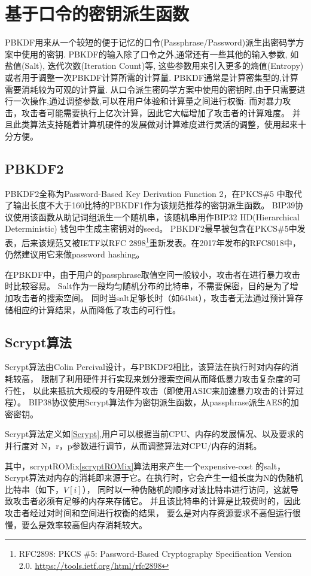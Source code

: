 
\section{基于口令的密钥派生函数}

PBKDF用来从一个较短的便于记忆的口令(Passphrase/Password)派生出密码学方案中使用的密钥.
PBKDF的输入除了口令之外,通常还有一些其他的输入参数, 如盐值(Salt), 迭代次数(Iteration Count)等,
这些参数用来引入更多的熵值(Entropy)或者用于调整一次PBKDF计算所需的计算量.
PBKDF通常是计算密集型的,计算需要消耗较为可观的计算量.
从口令派生密码学方案中使用的密钥时,由于只需要进行一次操作,通过调整参数,可以在用户体验和计算量之间进行权衡.
而对暴力攻击，攻击者可能需要执行上亿次计算，因此它大幅增加了攻击者的计算难度。
并且此类算法支持随着计算机硬件的发展做对计算难度进行灵活的调整，使用起来十分方便。

\subsection{PBKDF2}
PBKDF2全称为Password-Based Key Derivation Function 2，在PKCS\#5
中取代了输出长度不大于160比特的PBKDF1作为该规范推荐的密钥派生函数。
BIP39协议使用该函数从助记词组派生一个随机串，该随机串用作BIP32 HD(Hierarchical Deterministic)
钱包中生成主密钥对的seed。  PBKDF2最早被包含在PKCS\#5中发表，后来该规范又被IETF以RFC 
2898\footnote{
RFC2898: PKCS \#5: Password-Based Cryptography Specification Version 2.0.
\url{https://tools.ietf.org/html/rfc2898}}重新发表。在2017年发布的RFC8018中，仍然建议用它来做password hashing。

在PBKDF中，由于用户的passphrase取值空间一般较小，攻击者在进行暴力攻击时比较容易。
Salt作为一段均匀随机分布的比特串，不需要保密，目的是为了增加攻击者的搜索空间。
同时当salt足够长时（如64bit），攻击者无法通过预计算存储相应的计算结果，从而降低了攻击的可行性。

\subsection{Scrypt算法}
Scrypt算法由Colin Percival设计，与PBKDF2相比，该算法在执行时对内存的消耗较高，
限制了利用硬件并行实现来划分搜索空间从而降低暴力攻击复杂度的可行性，
以此来抵抗大规模的专用硬件攻击（即使用ASIC来加速暴力攻击的计算过程）。
BIP38协议使用Scrypt算法作为密钥派生函数，从passphrase派生AES的加密密钥。 
 
Scrypt算法定义如\ref{Scrypt},用户可以根据当前CPU、内存的发展情况、以及要求的并行度对
N，r，p参数进行调节，从而调整算法对CPU/内存的消耗。

其中，scryptROMix\ref{scryptROMix}算法用来产生一个expensive-cost 的salt，Scrypt算法对内存的消耗即来源于它。在执行时，它会产生一组长度为N的伪随机比特串（如下，$V[i]$），
同时以一种伪随机的顺序对该比特串进行访问，这就导致攻击者必须有足够的内存来存储它。
并且该比特串的计算是比较费时的，因此攻击者经过对时间和空间进行权衡的结果，
要么是对内存资源要求不高但运行很慢，要么是效率较高但内存消耗较大。


